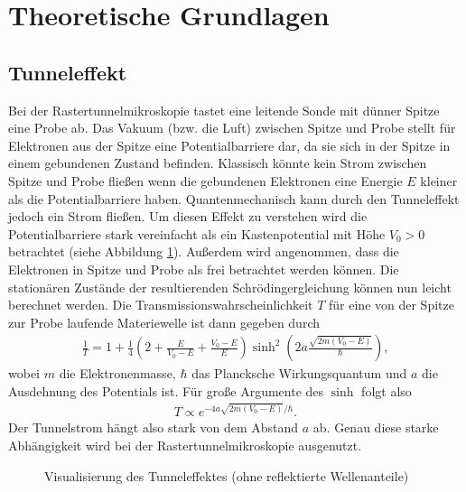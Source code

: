 \section{Theoretische Grundlagen}

\subsection{Tunneleffekt}
Bei der Rastertunnelmikroskopie tastet eine leitende Sonde mit dünner Spitze eine Probe ab. Das Vakuum (bzw. die Luft) zwischen Spitze und Probe stellt für Elektronen aus der Spitze eine Potentialbarriere dar, da sie sich in der Spitze in einem gebundenen Zustand befinden. Klassisch könnte kein Strom zwischen Spitze und Probe fließen wenn die gebundenen Elektronen eine Energie $E$ kleiner als die Potentialbarriere haben. Quantenmechanisch kann durch den Tunneleffekt jedoch ein Strom fließen. Um diesen Effekt zu verstehen wird die Potentialbarriere stark vereinfacht als ein Kastenpotential mit Höhe $V_0>0$ betrachtet (siehe Abbildung \ref{fig:tunnel}). Außerdem wird angenommen, dass die Elektronen in Spitze und Probe als frei betrachtet werden können. Die stationären Zustände der resultierenden Schrödingergleichung können nun leicht berechnet werden. Die Transmissionswahrscheinlichkeit $T$ für eine von der Spitze zur Probe laufende Materiewelle ist dann gegeben durch
\begin{align*}
  \frac{1}{T}=1+\frac{1}{4}\left( 2+\frac{E}{V_0-E} + \frac{V_0-E}{E}\right) \sinh^2\left( 2a \frac{\sqrt{2m(V_0-E)}}{\hbar} \right), 
\end{align*}
wobei $m$ die Elektronenmasse, $\hbar$ das Plancksche Wirkungsquantum und $a$ die Ausdehnung des Potentials ist.
Für große Argumente des $\sinh$ folgt also
\begin{align}
  T \propto e^{-4a\sqrt{2m(V_0-E)}/\hbar}.
  \label{eq:T}
\end{align}  
Der Tunnelstrom hängt also stark von dem Abstand $a$ ab. Genau diese starke Abhängigkeit wird bei der Rastertunnelmikroskopie ausgenutzt. 


\begin{figure}[h]
  \centering
  \caption{Visualisierung des Tunneleffektes (ohne reflektierte Wellenanteile)}
  \label{fig:tunnel}
\end{figure}

